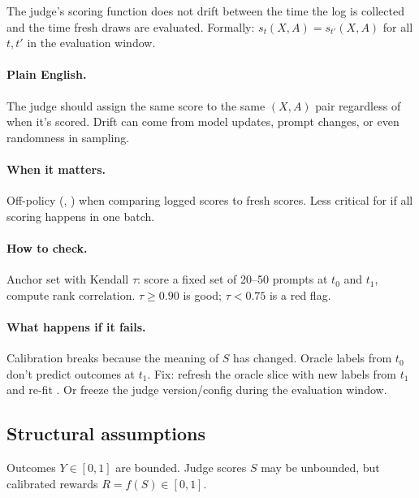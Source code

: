 \begin{assumption}
\label{assum:stability}
The judge's scoring function does not drift between the time the log is collected and the time fresh draws are evaluated. Formally: $s_t(X, A) = s_{t'}(X, A)$ for all $t, t'$ in the evaluation window.
\end{assumption}

\paragraph{Plain English.} The judge should assign the same score to the same $(X, A)$ pair regardless of when it's scored. Drift can come from model updates, prompt changes, or even randomness in sampling.

\paragraph{When it matters.} Off-policy (\ips, \dr) when comparing logged scores to fresh scores. Less critical for \dm{} if all scoring happens in one batch.

\paragraph{How to check.} Anchor set with Kendall $\tau$: score a fixed set of 20--50 prompts at $t_0$ and $t_1$, compute rank correlation. $\tau \ge 0.90$ is good; $\tau < 0.75$ is a red flag.

\paragraph{What happens if it fails.} Calibration breaks because the meaning of $S$ has changed. Oracle labels from $t_0$ don't predict outcomes at $t_1$. Fix: refresh the oracle slice with new labels from $t_1$ and re-fit \autocal. Or freeze the judge version/config during the evaluation window.

\subsection{Structural assumptions}

\begin{assumption}
\label{assum:bounded}
Outcomes $Y \in [0, 1]$ are bounded. Judge scores $S$ may be unbounded, but calibrated rewards $R = f(S) \in [0, 1]$.
\end{assumption}

